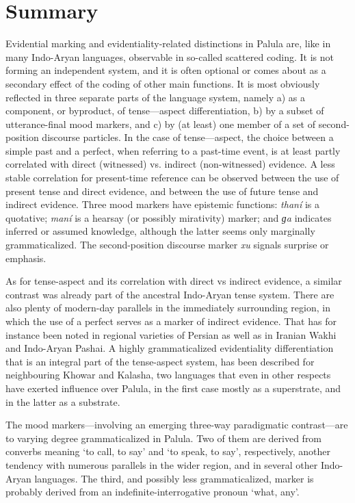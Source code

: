 \documentclass[output=paper]{langsci/langscibook}
\begin{document}
\section{Summary}\label{s:hl7}

Evidential marking and evidentiality-related distinctions in Palula are, like in many Indo-Aryan languages, observable in so-called scattered coding. It is not forming an independent system, and it is often optional or comes about as a secondary effect of the coding of other main functions. It is most obviously reflected in three separate parts of the language system, namely a) as a component, or byproduct, of tense—aspect differentiation, b) by a subset of utterance-final mood markers, and c) by (at least) one member of a set of second-position discourse particles. In the case of tense—aspect, the choice between a simple past and a perfect, when referring to a past-time event, is at least partly correlated with direct (witnessed) vs. indirect (non-witnessed) evidence. A less stable correlation for present-time reference can be observed between the use of present tense and direct evidence, and between the use of future tense and indirect evidence.  Three mood markers have epistemic functions: \textit{thaní} is a quotative; \textit{maní} is a hearsay (or possibly mirativity) marker; and \textit{ɡa} indicates inferred or assumed knowledge, although the latter seems only marginally grammaticalized. The second-position discourse marker \textit{xu} signals surprise or emphasis.

As for tense-aspect and its correlation with direct vs indirect evidence, a similar contrast was already part of the ancestral Indo-Aryan tense system. There are also plenty of modern-day parallels in the immediately surrounding region, in which the use of a perfect serves as a marker of indirect evidence. That has for instance been noted in regional varieties of Persian as well as in Iranian Wakhi and Indo-Aryan Pashai. A highly grammaticalized evidentiality differentiation that is an integral part of the tense-aspect system, has been described for neighbouring Khowar and Kalasha, two languages that even in other respects have exerted influence over Palula, in the first case mostly as a superstrate, and in the latter as a substrate. 

The mood markers—involving an emerging three-way paradigmatic contrast—are to varying degree grammaticalized in Palula. Two of them are derived from converbs meaning ‘to call, to say’ and ‘to speak, to say’, respectively, another tendency with numerous parallels in the wider region, and in several other Indo-Aryan languages. The third, and possibly less grammaticalized, marker is probably derived from an indefinite-interrogative pronoun ‘what, any’.  
\end{document}
